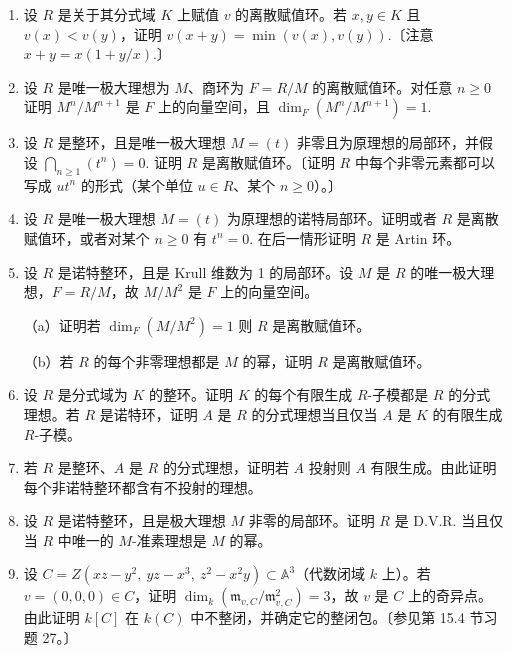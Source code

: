 \begin{enumerate}
\item 设 \(R\) 是关于其分式域 \(K\) 上赋值 \(v\) 的离散赋值环。若 \(x, y \in K\) 且 \(v(x) < v(y)\)，证明 \(v(x+y) = \min(v(x), v(y))\).〔注意 \(x+y = x(1+y/x)\).〕

\item 设 \(R\) 是唯一极大理想为 \(M\)、商环为 \(F = R/M\) 的离散赋值环。对任意 \(n \geq 0\) 证明 \(M^n/M^{n+1}\) 是 \(F\) 上的向量空间，且 \(\dim_F(M^n/M^{n+1}) = 1\).

\item 设 \(R\) 是整环，且是唯一极大理想 \(M = (t)\) 非零且为原理想的局部环，并假设 \(\bigcap_{n \geq 1}(t^n) = 0\). 证明 \(R\) 是离散赋值环。〔证明 \(R\) 中每个非零元素都可以写成 \(ut^n\) 的形式（某个单位 \(u \in R\)、某个 \(n \geq 0\)）。〕

\item 设 \(R\) 是唯一极大理想 \(M = (t)\) 为原理想的诺特局部环。证明或者 \(R\) 是离散赋值环，或者对某个 \(n \geq 0\) 有 \(t^n = 0\). 在后一情形证明 \(R\) 是 Artin 环。

\item 设 \(R\) 是诺特整环，且是 Krull 维数为 1 的局部环。设 \(M\) 是 \(R\) 的唯一极大理想，\(F = R/M\)，故 \(M/M^2\) 是 \(F\) 上的向量空间。

（a）证明若 \(\dim_F(M/M^2) = 1\) 则 \(R\) 是离散赋值环。

（b）若 \(R\) 的每个非零理想都是 \(M\) 的幂，证明 \(R\) 是离散赋值环。

\item 设 \(R\) 是分式域为 \(K\) 的整环。证明 \(K\) 的每个有限生成 \(R\)-子模都是 \(R\) 的分式理想。若 \(R\) 是诺特环，证明 \(A\) 是 \(R\) 的分式理想当且仅当 \(A\) 是 \(K\) 的有限生成 \(R\)-子模。

\item 若 \(R\) 是整环、\(A\) 是 \(R\) 的分式理想，证明若 \(A\) 投射则 \(A\) 有限生成。由此证明每个非诺特整环都含有不投射的理想。

\item 设 \(R\) 是诺特整环，且是极大理想 \(M\) 非零的局部环。证明 \(R\) 是 D.V.R. 当且仅当 \(R\) 中唯一的 \(M\)-准素理想是 \(M\) 的幂。

\item 设 \(C = Z(xz-y^2,\ yz-x^3,\ z^2-x^2y) \subset \mathbb{A}^3\)（代数闭域 \(k\) 上）。若 \(v = (0,0,0) \in C\)，证明 \(\dim_k(\mathfrak{m}_{v,C}/\mathfrak{m}_{v,C}^2) = 3\)，故 \(v\) 是 \(C\) 上的奇异点。由此证明 \(k[C]\) 在 \(k(C)\) 中不整闭，并确定它的整闭包。〔参见第 15.4 节习题 27。〕
\end{enumerate}

